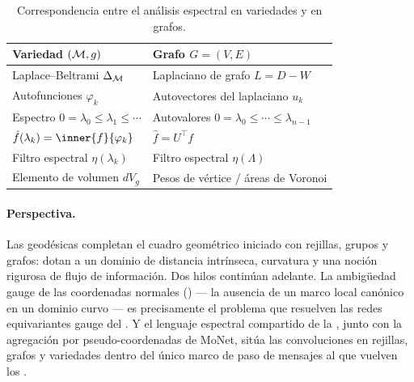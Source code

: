\begin{table}[h]
\centering
\caption{Correspondencia entre el an\'alisis espectral en variedades y en grafos.}
\label{tab:geo:analogy}
\begin{tabular}{@{}p{5.4cm}p{6.0cm}@{}}
\toprule
\textbf{Variedad $(\mathcal{M}, g)$} & \textbf{Grafo $G = (V,E)$} \\
\midrule
Laplace--Beltrami $\Delta_{\mathcal{M}}$ & Laplaciano de grafo $L = D - W$ \\
\addlinespace
Autofunciones $\varphi_k$ & Autovectores del laplaciano $u_k$ \\
\addlinespace
Espectro $0 = \lambda_0 \le \lambda_1 \le \cdots$ & Autovalores $0 = \lambda_0 \le \cdots \le \lambda_{n-1}$ \\
\addlinespace
$\hat f(\lambda_k) = \inner{f}{\varphi_k}$ & $\hat f = U^\top f$ \\
\addlinespace
Filtro espectral $\eta(\lambda_k)$ & Filtro espectral $\eta(\Lambda)$ \\
\addlinespace
Elemento de volumen $dV_g$ & Pesos de v\'ertice / \'areas de Voronoi \\
\bottomrule
\end{tabular}
\end{table}

\paragraph{Perspectiva.}
Las geod\'esicas completan el cuadro geom\'etrico iniciado con rejillas, grupos y
grafos: dotan a un dominio de distancia intr\'inseca, curvatura y una noci\'on
rigurosa de flujo de informaci\'on. Dos hilos contin\'uan adelante. La
ambig\"uedad gauge de las coordenadas normales () --- la
ausencia de un marco local can\'onico en un dominio curvo --- es precisamente el
problema que resuelven las redes equivariantes gauge del . Y el
lenguaje espectral compartido de la , junto con la
agregaci\'on por pseudo-coordenadas de MoNet, sit\'ua las convoluciones en
rejillas, grafos y variedades dentro del \'unico marco de paso de mensajes al
que vuelven los .
